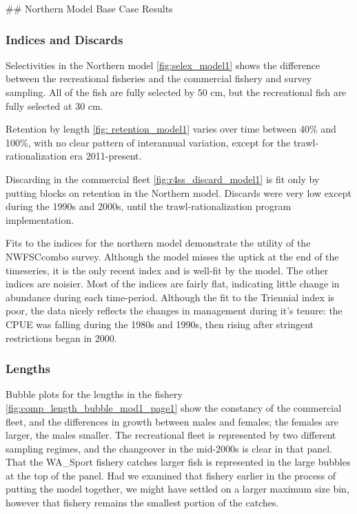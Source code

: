 \documentclass[12pt,]{article}
\begin{document}
\clearpage
 \#\# Northern Model Base Case Results

\subsubsection{Indices and Discards}\label{indices-and-discards}

Selectivities in the Northern model \ref{fig:selex_model1} shows the
difference between the recreational fisheries and the commercial fishery
and survey sampling. All of the fish are fully selected by 50 cm, but
the recreational fish are fully selected at 30 cm.

Retention by length \ref{fig: retention_model1} varies over time between
40\% and 100\%, with no clear pattern of interannual variation, except
for the trawl-rationalization era 2011-present.

Discarding in the commercial fleet \ref{fig:r4ss_discard_model1} is fit
only by putting blocks on retention in the Northern model. Discards were
very low except during the 1990s and 2000s, until the
trawl-rationalization program implementation.

Fits to the indices for the northern model demonstrate the utility of
the NWFSCcombo survey. Although the model misses the uptick at the end
of the timeseries, it is the only recent index and is well-fit by the
model. The other indices are noisier. Most of the indices are fairly
flat, indicating little change in abundance during each time-period.
Although the fit to the Triennial index is poor, the data nicely
reflects the changes in management during it's tenure: the CPUE was
falling during the 1980s and 1990s, then rising after stringent
restrictions began in 2000.

\subsubsection{Lengths}\label{lengths}

Bubble plots for the lengths in the fishery
\ref{fig:comp_length_bubble_mod1_page1} show the constancy of the
commercial fleet, and the differences in growth between males and
females; the females are larger, the males smaller. The recreational
fleet is represented by two different sampling regimes, and the
changeover in the mid-2000s is clear in that panel. That the WA\_Sport
fishery catches larger fish is represented in the large bubbles at the
top of the panel. Had we examined that fishery earlier in the process of
putting the model together, we might have settled on a larger maximum
size bin, however that fishery remains the smallest portion of the
catches.
\end{document}
